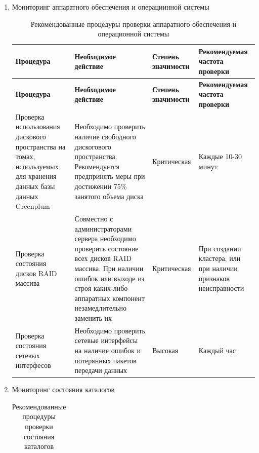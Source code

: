 \begin{enumerate}[1.]
{\begin{longtable}{|p{3.5cm}|p{6.5cm}|p{2.2cm}|p{2.8cm}|}
	\end{longtable}
	}
	
	\item Мониторинг аппаратного обеспечения и операциинной системы
	
	{\small 
		\begin{longtable}{|p{3.5cm}|p{6.5cm}|p{2.2cm}|p{2.8cm}|}
			\caption{Рекомендованные процедуры проверки аппаратного обеспечения и операционной системы}
			\label{tab:table_3} \\
			
			\hline
			\textbf{Процедура} & \textbf{Необходимое действие} & \textbf{Степень значимости} & \textbf{Рекомендуемая частота проверки} \\
			\hline
			\endfirsthead
			
			\hline
			\textbf{Процедура} & \textbf{Необходимое действие} & \textbf{Степень значимости} & \textbf{Рекомендуемая частота проверки} \\
			\hline
			\endhead
			
			Проверка использования дискового пространства на томах, используемых для хранения данных базы данных Greenplum &
			Необходимо проверить наличие свободного дискогового пространства. Рекомендуется предпринять меры при достижении 75\% занятого объема диска &
			Критическая & Каждые 10-30 минут \\
			\hline
			
			Проверка состояния дисков RAID массива &
			Совместно с администраторами сервера необходимо проверить состояние всех дисков RAID массива. При наличии ошибок или выходе из строя каких-либо аппаратных компонент незамедлительно заменить их &
			Критическая & При создании кластера, или при наличии признаков неисправности \\
			\hline
			
			Проверка состояния сетевых интерфесов &
			Необходимо проверить сетевые интерфейсы на наличие ошибок и потерянных пакетов передачи данных &
			Высокая & Каждый час  \\
			\hline
		\end{longtable}
	}
	
	\item Мониторинг состояния каталогов
	
	{\small 
		\begin{longtable}{|p{3.5cm}|p{6.5cm}|p{2.2cm}|p{2.8cm}|}
			\caption{Рекомендованные процедуры проверки состояния каталогов}
			\label{tab:table_4} \\
			

\end{longtable}}
\end{enumerate}
